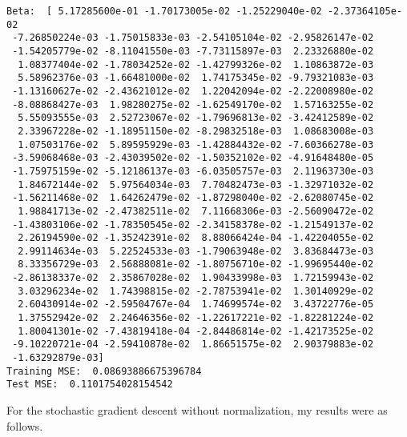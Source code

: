 \documentclass[12pt]{article}
\begin{document}
\begin{verbatim}
Beta:  [ 5.17285600e-01 -1.70173005e-02 -1.25229040e-02 -2.37364105e-02
 -7.26850224e-03 -1.75015833e-03 -2.54105104e-02 -2.95826147e-02
 -1.54205779e-02 -8.11041550e-03 -7.73115897e-03  2.23326880e-02
  1.08377404e-02 -1.78034252e-02 -1.42799326e-02  1.10863872e-03
  5.58962376e-03 -1.66481000e-02  1.74175345e-02 -9.79321083e-03
 -1.13160627e-02 -2.43621012e-02  1.22042094e-02 -2.22008980e-02
 -8.08868427e-03  1.98280275e-02 -1.62549170e-02  1.57163255e-02
  5.55093555e-03  2.52723067e-02 -1.79696813e-02 -3.42412589e-02
  2.33967228e-02 -1.18951150e-02 -8.29832518e-03  1.08683008e-03
  1.07503176e-02  5.89595929e-03 -1.42884432e-02 -7.60366278e-03
 -3.59068468e-03 -2.43039502e-02 -1.50352102e-02 -4.91648480e-05
 -1.75975159e-02 -5.12186137e-03 -6.03505757e-03  2.11963730e-03
  1.84672144e-02  5.97564034e-03  7.70482473e-03 -1.32971032e-02
 -1.56211468e-02  1.64262479e-02 -1.87298040e-02 -2.62080745e-02
  1.98841713e-02 -2.47382511e-02  7.11668306e-03 -2.56090472e-02
 -1.43803106e-02 -1.78350545e-02 -2.34158378e-02 -1.21549137e-02
  2.26194590e-02 -1.35242391e-02  8.88066424e-04 -1.42204055e-02
  2.99114634e-03  5.22524533e-03 -1.79063948e-02  3.83684473e-03
  8.33356729e-03  2.56888081e-02 -1.80756710e-02 -1.99695440e-02
 -2.86138337e-02  2.35867028e-02  1.90433998e-03  1.72159943e-02
  3.03296234e-02  1.74398815e-02 -2.78753941e-02  1.30140929e-02
  2.60430914e-02 -2.59504767e-04  1.74699574e-02  3.43722776e-05
  1.37552942e-02  2.24646356e-02 -1.22617221e-02 -1.82281224e-02
  1.80041301e-02 -7.43819418e-04 -2.84486814e-02 -1.42173525e-02
 -9.10220721e-04 -2.59410878e-02  1.86651575e-02  2.90379883e-02
 -1.63292879e-03]
Training MSE:  0.08693886675396784
Test MSE:  0.1101754028154542
\end{verbatim}
\normalsize
For the stochastic gradient descent without normalization, my results were as follows.
\scriptsize
\end{document}
